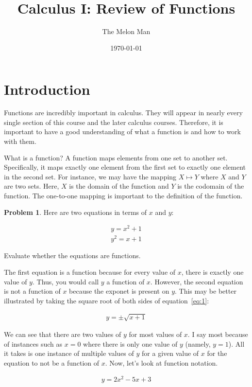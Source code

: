 \documentclass[12pt]{article}
\title{Calculus I: Review of Functions}
\author{The Melon Man}
\date{\today}
\theoremstyle{definition}
\newtheorem{problem}{Problem}
\begin{document}
\maketitle

\section{Introduction}
Functions are incredibly important in calculus.
They will appear in nearly every single section of this course and the later calculus courses.
Therefore, it is important to have a good understanding of what a function is and how to work with them.

What is a function?
A function maps elements from one set to another set.
Specifically, it maps exactly one element from the first set to exactly one element in the second set.
For instance, we may have the mapping $X \mapsto Y$ where $X$ and $Y$ are two sets.
Here, $X$ is the domain of the function and $Y$ is the codomain of the function.
The one-to-one mapping is important to the definition of the function.

\begin{problem}
Here are two equations in terms of $x$ and $y$:

\begin{align}
    y = x^2 + 1 \\
    y^2 = x + 1 \label{eq:1}
\end{align}

Evaluate whether the equations are functions.
\end{problem}

The first equation is a function because for every value of $x$, there is exactly one value of $y$.
Thus, you would call $y$ a function of $x$.
However, the second equation is not a function of $x$ because the exponet is present on $y$.
This may be better illustrated by taking the square root of both sides of equation~\eqref{eq:1}:

\begin{align*}
    y = \pm \sqrt{x + 1}
\end{align*}

We can see that there are two values of $y$ for most values of $x$.
I say most because of instances such as $x = 0$ where there is only one value of $y$ (namely, $y = 1$).
All it takes is one instance of multiple values of $y$ for a given value of $x$ for the equation to not be a function of $x$.
Now, let's look at function notation.

\begin{align}
    \label{eq:2} y = 2x^2-5x+3
\end{align}
\end{document}
